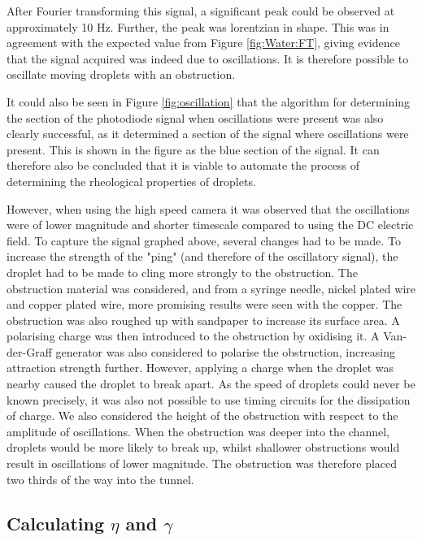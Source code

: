 \documentclass{physics_article_B}
\begin{document}
        After Fourier transforming this signal, a significant peak could be observed at approximately 10 Hz. Further, the peak was lorentzian in shape. This was in agreement with the expected value from Figure \ref{fig:Water:FT}, giving evidence that the signal acquired was indeed due to oscillations. It is therefore possible to oscillate moving droplets with an obstruction.
        
        It could also be seen in Figure \ref{fig:oscillation} that the algorithm for determining the section of the photodiode signal when oscillations were present was also clearly successful, as it determined a section of the signal where oscillations were present. This is shown in the figure as the blue section of the signal. It can therefore also be concluded that it is viable to automate the process of determining the rheological properties of droplets.
        
        However, when using the high speed camera it was observed that the oscillations were of lower magnitude and shorter timescale compared to using the DC electric field. To capture the signal graphed above, several changes had to be made. To increase the strength of the "ping" (and therefore of the oscillatory signal), the droplet had to be made to cling more strongly to the obstruction. The obstruction material was considered, and from a syringe needle, nickel plated wire and copper plated wire, more promising results were seen with the copper. The obstruction was also roughed up with sandpaper to increase its surface area. A polarising charge was then introduced to the obstruction by oxidising it. A Van-der-Graff generator was also considered to polarise the obstruction, increasing attraction strength further. However, applying a charge when the droplet was nearby caused the droplet to break apart. As the speed of droplets could never be known precisely, it was also not possible to use timing circuits for the dissipation of charge. We also considered the height of the obstruction with respect to the amplitude of oscillations. When the obstruction was deeper into the channel, droplets would be more likely to break up, whilst shallower obstructions would result in oscillations of lower magnitude. The obstruction was therefore placed two thirds of the way into the tunnel.
        
    \subsection{Calculating $\eta$ and $\gamma$}
    
\end{document}

